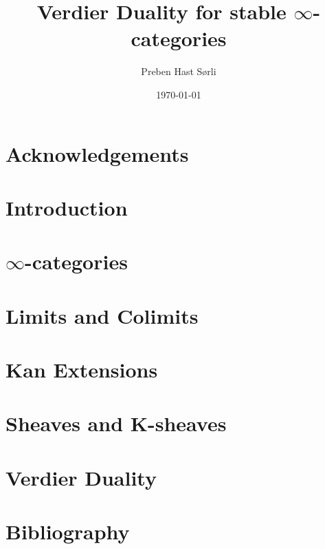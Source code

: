 \documentclass[british,titlepage]{ntnuthesis}
\title{Verdier Duality for stable $\infty$-categories}
\author{Preben Hast Sørli}
\date{\today}
\begin{document}

\chapter*{Acknowledgements}
\tableofcontents
\chapter*{Introduction}

\chapter{$\infty$-categories}\label{infcatchap}

\chapter{Limits and Colimits}\label{limscolims}



\chapter{Kan Extensions}\label{kanchap}

\chapter{Sheaves and K-sheaves}\label{sheavescap}


\chapter{Verdier Duality}\label{verdiercap}

\chapter*{Bibliography}
\printbibliography[heading=none]
\end{document}
